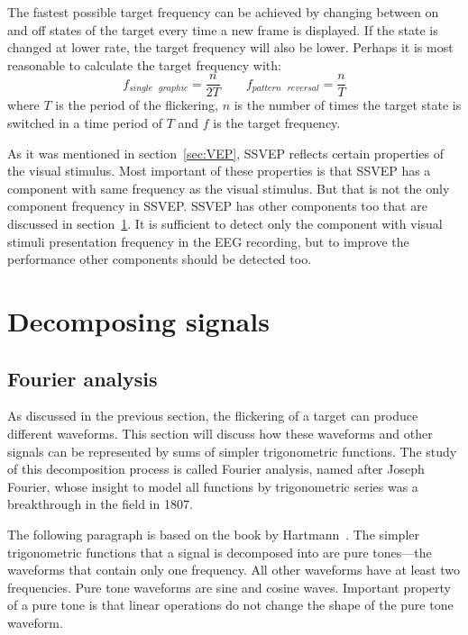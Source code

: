 The fastest possible target frequency can be achieved by changing between on and off states of the target every time a new frame is displayed. If the state is changed at lower rate, the \gls{target} frequency will also be lower. Perhaps it is most reasonable to calculate the \gls{target} frequency with:
\begin{equation}
	f_{single\mbox{ }graphic} = \frac{n}{2T} \qquad f_{pattern\mbox{ }reversal} = \frac{n}{T}
\end{equation}
where $T$ is the period of the \gls{flickering}, $n$ is the number of times the target state is switched in a time period of $T$ and $f$ is the target frequency.

As it was mentioned in section~\ref{sec:VEP}, \gls{SSVEP} reflects certain properties of the visual stimulus. Most important of these properties is that \gls{SSVEP} has a component with same frequency as the visual stimulus. But that is not the only component frequency in \gls{SSVEP}. \gls{SSVEP} has other components too that are discussed in section~\ref{sec:fourier}. It is sufficient to detect only the component with visual stimuli presentation frequency in the \gls{EEG} recording, but to improve the performance other components should be detected too.


\section{Decomposing signals}
\label{sec:fourier}

\subsection{Fourier analysis}

As discussed in the previous section, the flickering of a target can produce different waveforms. This section will discuss how these waveforms and other signals can be represented by sums of simpler trigonometric functions. The study of this decomposition process is called Fourier analysis, named after Joseph Fourier, whose insight to model all functions by trigonometric series was a breakthrough in the field in 1807.

The following paragraph is based on the book by Hartmann~\cite{pure_tone}. The simpler trigonometric functions that a signal is decomposed into are pure tones---the waveforms that contain only one frequency. All other waveforms have at least two frequencies. Pure tone waveforms are sine and cosine waves. Important property of a pure tone is that linear operations do not change the shape of the pure tone waveform.

